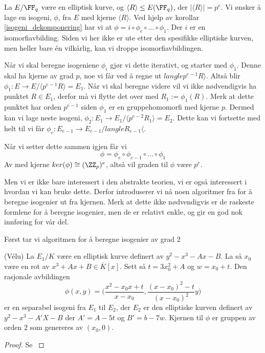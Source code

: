 \begin{eksempel}
\label{eksempel_dekomponere_isogeni}
La $E/\FF_q$ være en elliptisk kurve, og $\langle R\rangle \leq E(\FF_q)$, der $|\langle R \rangle | = p^e$. Vi ønsker å lage en isogeni, $\phi$, fra $E$ med kjerne $\langle R \rangle$. Ved hjelp av korollar \ref{isogeni_dekomponering} har vi at $\phi = i \circ \phi_e \circ \ldots \circ \phi_1$. Der $i$ er en isomorfiavbilding. Siden vi her ikke er ute etter den spesifikke elliptiske kurven, men heller bare én vilkårlig, kan vi droppe isomorfiavbildingen.

Når vi skal beregne isogeniene $\phi_i$ gjør vi dette iterativt, og starter med $\phi_1$. Denne skal ha kjerne av grad $p$, noe vi får ved å regne ut $langle p^{e-1}R \rangle$. Altså blir $\phi_1 : E \rightarrow E/\langle p^{e-1}R \rangle = E_1$. Når vi skal beregne videre vil vi ikke nødvendigvis ha punktet $R \in E_1$, derfor må vi flytte det over med $R_1 := \phi_1(R)$. Merk at dette punktet har orden $p^{e-1}$ siden $\phi_1$ er en gruppehomomorfi med kjerne $p$. Dermed kan vi lage neste isogeni, $\phi_2 : E_1 \rightarrow E_1 / \langle p^{e-2}R_1 \rangle = E_2$. Dette kan vi fortsette med helt til vi får $\phi_e : E_{e-1} \rightarrow E_{e-1} /langle R_{e-1} \langle$. 

Når vi setter dette sammen igjen får vi $$\phi = \phi_e \circ \phi_{e-1} \circ \ldots \circ \phi_1 $$ Av med kjerne $ker(\phi) \cong (\ZZ_p)^e$, altså vil graden til $\phi$ være $p^e$.
\end{eksempel}

Men vi er ikke bare interessert i den abstrakte teorien, vi er også interessert i hvordan vi kan bruke dette. Derfor introduserer vi nå noen algoritmer fra for å beregne isogenier ut fra kjernen. Merk at dette ikke nødvendigvis er de raskeste formlene for å beregne isogenier, men de er relativt enkle, og gir en god nok innføring for vår del.


Først tar vi algoritmen for å beregne isogenier av grad 2
\begin{teorem}
(Vélu) \cite{velu} La $E_1/K$ være en elliptisk kurve definert av $y^2 - x^3 - Ax - B$. La så $x_0$ være en rot av $x^3 + Ax + B \in \overline{K}[x]$. Sett så $t = 3x_0^2 + A$ og $w = x_0 + t$. Den rasjonale avbildingen $$\phi(x,y) = \Bigg( \frac{x^2-x_0x+t}{x-x_0}, \frac{(x- x_0)^2 - t}{(x-x_0)^2}y \Bigg)$$ er en separabel isogeni fra $E_1$  til $E_2$, der $E_2$ er den elliptiske kurven definert av $y^2 - x^3 - A'X - B$ der $A' = A - 5t$ og $B' = b - 7w$. Kjernen til $\phi$ er gruppen av orden 2 som genereres av $(x_0, 0)$. 
\begin{proof}
Se \cite[6.12]{sutherland-notes}
\end{proof}
\end{teorem}

